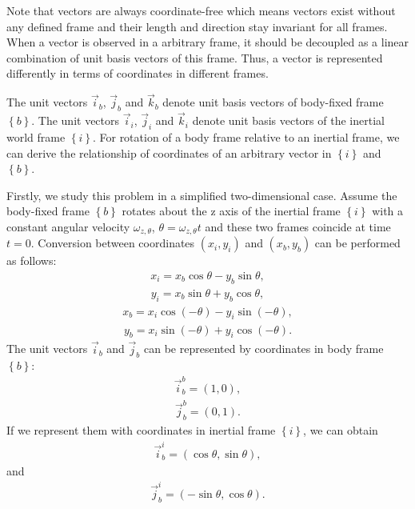 Note that vectors are always coordinate-free which means vectors exist without any defined frame and their length and direction stay invariant for all frames. When a vector is observed in a arbitrary frame, it should be decoupled as a linear combination of unit basis vectors of this frame. Thus, a vector is represented differently in terms of coordinates in different frames. 

The unit vectors  $\vec{i}_{b}$, $\vec{j}_{b}$ and $\vec{k}_{b}$ denote unit basis vectors of body-fixed frame $\left\{ b \right\}$. The unit vectors  $\vec{i}_{i}$, $\vec{j}_{i}$ and $\vec{k}_{i}$ denote unit basis vectors of the inertial world frame $\left\{ i \right\}$. For rotation of a body frame relative to an inertial frame, we can derive the relationship of coordinates of an arbitrary vector in $\left\{ i \right\}$ and $\left\{ b \right\}$.

Firstly, we study this problem in a simplified two-dimensional case. Assume the body-fixed frame $\left\{ b \right\}$ rotates about the z axis of the inertial frame $\left\{ i \right\}$ with a constant angular velocity $\omega_{z,\theta}$, $\theta=\omega_{z,\theta}t$ and these two frames coincide at time $t=0$. Conversion between coordinates $(x_{i}, y_{i})$ and $(x_{b}, y_{b})$ can be performed as follows:
 \begin{align}
x_{i}=x_{b}\cos\theta-y_{b}\sin\theta,
\end{align}
\begin{align}
y_{i}=x_{b}\sin\theta+y_{b}\cos\theta,
\end{align}
\begin{align}
x_{b}=x_{i}\cos(-\theta)-y_{i}\sin(-\theta),
\end{align}
\begin{align}
y_{b}=x_{i}\sin(-\theta)+y_{i}\cos(-\theta).
\end{align}
The unit vectors $\vec{i}_{b}$ and $\vec{j}_{b}$ can be represented by coordinates in body frame $\left\{ b \right\}$:
\begin{align}
\vec{i}_{b}^{b}=(1,0),
\end{align}
\begin{align}
\vec{j}_{b}^{b}=(0,1).
\end{align}
If we represent them with coordinates in inertial frame $\left\{ i \right\}$, we can obtain
\begin{align}
\vec{i}_{b}^{i}=(\cos\theta,\sin\theta),
\end{align}
and
\begin{align}
\vec{j}_{b}^{i}=(-\sin\theta,\cos\theta).
\end{align}

